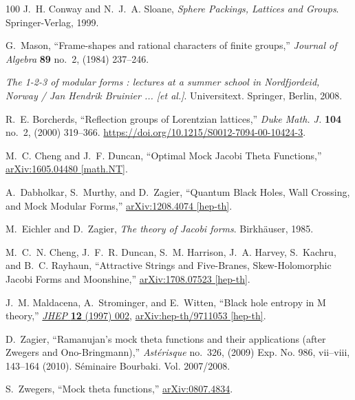 \begin{thebibliography}{100}
J.~H. Conway and N.~J.~A. Sloane, {\em {Sphere Packings, Lattices and Groups}}.
\newblock Springer-Verlag, 1999.

G.~Mason, ``Frame-shapes and rational characters of finite groups,'' {\em
  Journal of Algebra} {\bfseries 89} no.~2, (1984) 237--246.

{\em The 1-2-3 of modular forms : lectures at a summer school in Nordfjordeid,
  Norway / Jan Hendrik Bruinier ... [et al.]}.
\newblock Universitext. Springer, Berlin, 2008.

R.~E. Borcherds, ``Reflection groups of {L}orentzian lattices,'' {\em Duke
  Math. J.} {\bfseries 104} no.~2, (2000) 319--366.
  \url{https://doi.org/10.1215/S0012-7094-00-10424-3}.

M.~C. Cheng and J.~F. Duncan, ``{Optimal Mock Jacobi Theta Functions},''
  \href{http://arxiv.org/abs/1605.04480}{{\ttfamily arXiv:1605.04480
  [math.NT]}}.

A.~Dabholkar, S.~Murthy, and D.~Zagier, ``{Quantum Black Holes, Wall Crossing,
  and Mock Modular Forms},''
\href{http://arxiv.org/abs/1208.4074}{{\ttfamily arXiv:1208.4074 [hep-th]}}.

M.~Eichler and D.~Zagier, {\em {The theory of Jacobi forms}}.
\newblock Birkh{\"a}user, 1985.

M.~C.~N. Cheng, J.~F.~R. Duncan, S.~M. Harrison, J.~A. Harvey, S.~Kachru, and
  B.~C. Rayhaun, ``{Attractive Strings and Five-Branes, Skew-Holomorphic Jacobi
  Forms and Moonshine},''
\href{http://arxiv.org/abs/1708.07523}{{\ttfamily arXiv:1708.07523 [hep-th]}}.

J.~M. Maldacena, A.~Strominger, and E.~Witten, ``{Black hole entropy in M
  theory},'' \href{http://dx.doi.org/10.1088/1126-6708/1997/12/002}{{\em JHEP}
  {\bfseries 12} (1997) 002},
\href{http://arxiv.org/abs/hep-th/9711053}{{\ttfamily arXiv:hep-th/9711053
  [hep-th]}}.

D.~Zagier, ``Ramanujan's mock theta functions and their applications (after
  {Z}wegers and {O}no-{B}ringmann),'' {\em Ast\'erisque} no.~326, (2009) Exp.
  No. 986, vii--viii, 143--164 (2010). S{\'e}minaire Bourbaki. Vol. 2007/2008.

S.~Zwegers, ``Mock theta functions,''
  \href{http://arxiv.org/abs/arXiv:0807.4834}{{\ttfamily arXiv:0807.4834}}.


\end{thebibliography}
